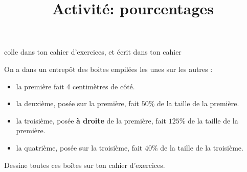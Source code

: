 \documentclass[a4paper,12pt]{article}
\title{Activité: pourcentages}
\date{}
\author{}
\makeatletter
\renewcommand{\maketitle}{%
{\scriptsize colle dans ton cahier d'exercices, et écrit dans ton cahier} \vspace{0.5em}

	\begin{center}
		\LARGE
		\uline{\@title}
	\end{center}
}
\makeatother
\begin{document}
\maketitle

\begin{attention}[frametitle={Exercice 1}]
	On a dans un entrepôt des boites empilées les unes sur les autres :

	\begin{itemize}
		\item la première fait 4 centimètres de côté.
		\item la deuxième, posée sur la première, fait $50\%$ de la taille de la première.
		\item la troisième, posée \textbf{à droite} de la première, fait $125\%$ de la taille de la première.
		\item la quatrième, posée sur la troisième, fait $40\%$ de la taille de la troisième.
	\end{itemize}

	Dessine toutes ces boîtes sur ton cahier d'exercices.
\end{attention}
\end{document}
